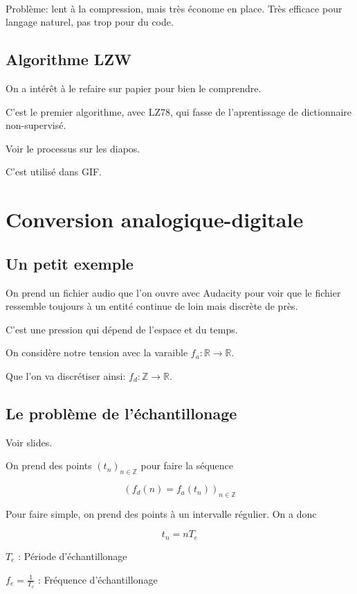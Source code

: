 \documentclass[a4paper,11pt]{article}
\newcommand{\R}{\mathbb{R}}
\newcommand{\Z}{\mathbb{Z}}
\begin{document}
\

Problème: lent à la compression, mais très économe en place. Très efficace pour
langage naturel, pas trop pour du code.

\subsection{Algorithme LZW}

On a intérêt à le refaire sur papier pour bien le comprendre.

C'est le premier algorithme, avec LZ78, qui fasse de l'aprentissage de
dictionnaire non-supervisé.

Voir le processus sur les diapos.

C'est utilisé dans GIF.

\section{Conversion analogique-digitale}

\subsection{Un petit exemple}

On prend un fichier audio que l'on ouvre avec Audacity pour voir que le fichier
ressemble toujours à un entité continue de loin mais discrète de près.

C'est une pression qui dépend de l'espace et du temps.

On considère notre tension avec la varaible $f_a : \R \rightarrow \R$.

Que l'on va discrétiser ainsi: $f_d: \Z \rightarrow \R$.

\subsection{Le problème de l'échantillonage}

Voir slides.

On prend des points $(t_n)_{n \in \Z}$ pour faire la séquence

$$(f_d(n) = f_a(t_n))_{n \in \Z}$$

Pour faire simple, on prend des points à un intervalle régulier. On a donc

$$ t_n = nT_e $$

$T_e$ : Période d'échantillonage

$f_e = \frac{1}{T_e}$ : Fréquence d'échantillonage
\end{document}
